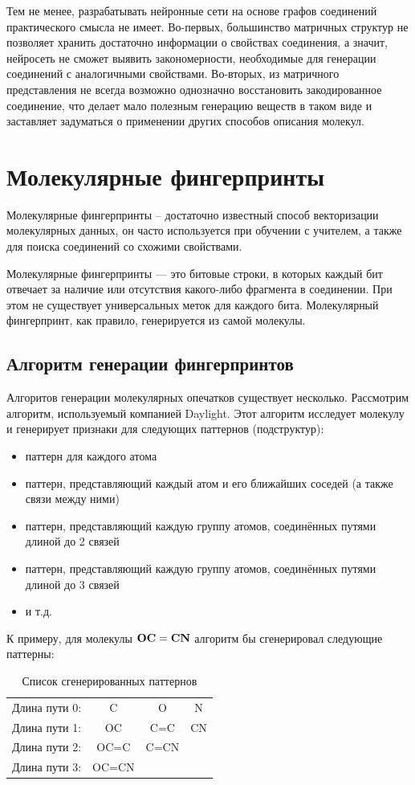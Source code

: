 \documentclass[a4paper,14pt]{extreport}
\begin{document}
Тем не менее, разрабатывать нейронные сети на основе графов соединений практического смысла не имеет. Во-первых, большинство матричных структур не позволяет хранить достаточно информации о свойствах соединения, а значит, нейросеть не сможет выявить закономерности, необходимые для генерации соединений с аналогичными свойствами. Во-вторых, из матричного представления не всегда возможно однозначно восстановить закодированное соединение, что делает мало полезным генерацию веществ в таком виде и заставляет задуматься о применении других способов описания молекул.


  \chapter{Молекулярные фингерпринты}
  \label{c:fingerprints}
  Молекулярные фингерпринты – достаточно известный способ векторизации молекулярных данных, он часто используется при обучении с учителем, а также для поиска соединений со схожими свойствами.
  
Молекулярные фингерпринты — это битовые строки, в которых каждый бит отвечает за наличие или отсутствия какого-либо фрагмента в соединении. При этом не существует универсальных меток для каждого бита. Молекулярный фингерпринт, как правило, генерируется из самой молекулы. 

  \section{Алгоритм генерации фингерпринтов}
  \label{s:fp_generation_sec}
  Алгоритов генерации молекулярных опечатков существует несколько. Рассмотрим алгоритм, используемый компанией Daylight. Этот алгоритм исследует молекулу и генерирует признаки для следующих паттернов (подструктур):
  \begin{itemize}
	\item паттерн для каждого атома
	\item паттерн, представляющий каждый атом и его ближайших соседей (а также связи между ними)
	\item паттерн, представляющий каждую группу атомов, соединённых путями длиной до 2 связей
	\item паттерн, представляющий каждую группу атомов, соединённых путями длиной до 3 связей
	\item и т.д.
  \end{itemize}
К примеру, для молекулы $\bold{OC=CN}$ алгоритм бы сгенерировал следующие паттерны:

\begin{table}[H]
\caption{Список сгенерированных паттернов}
\begin{center}
\begin{tabular}{cccc}
	Длина пути 0: & C & O & N\\
	Длина пути 1: & OC & C=C & CN\\
	Длина пути 2: & OC=C & C=CN\\
	Длина пути 3: & OC=CN
\end{tabular}
\end{center}
\end{table}
\end{document}
